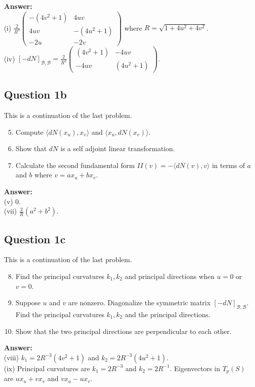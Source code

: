 \documentclass[12pt, a4paper]{article}
\newcommand{\inner}[1]{\langle #1 \rangle}
\begin{document}
\vspace{1em}
\noindent\textbf{Answer:}\\
(i) $\frac{2}{R^{3}}\begin{pmatrix}-(4v^{2}+1)&4uv\\ 4uv&-(4u^{2}+1)\\ -2u&-2v\end{pmatrix}$ where $R=\sqrt{1+4u^{2}+4v^{2}}$.\\
(iv) $[-dN]_{\mathcal{B},\mathcal{B}} = \frac{2}{R^{3}}\begin{pmatrix}(4v^{2}+1)&-4uv\\ -4uv&(4u^{2}+1)\end{pmatrix}$.
\newpage

\subsection*{Question 1b}
This is a continuation of the last problem.
\begin{enumerate}[label=(\roman*)]
    \setcounter{enumi}{4}
    \item Compute $\inner{dN(x_{u}),x_{v}}$ and $\inner{x_{u},dN(x_{v})}$.
    \item Show that $dN$ is a self adjoint linear transformation.
    \item Calculate the second fundamental form $II(v)=-\inner{dN(v),v}$ in terms of $a$ and $b$ where $v=ax_{u}+bx_{v}$.
\end{enumerate}
\vspace{1em}
\noindent\textbf{Answer:}\\
(v) 0. \\
(vii) $\frac{2}{R}(a^{2}+b^{2})$.
\newpage

\subsection*{Question 1c}
This is a continuation of the last problem.
\begin{enumerate}[label=(\roman*)]
    \setcounter{enumi}{7}
    \item Find the principal curvatures $k_1, k_2$ and principal directions when $u=0$ or $v=0$.
    \item Suppose $u$ and $v$ are nonzero. Diagonalize the symmetric matrix $[-dN]_{\mathcal{B},\mathcal{B}}$. Find the principal curvatures $k_1, k_2$ and the principal directions.
    \item Show that the two principal directions are perpendicular to each other.
\end{enumerate}
\vspace{1em}
\noindent\textbf{Answer:}\\
(viii) $k_{1}=2R^{-3}(4v^{2}+1)$ and $k_{2}=2R^{-3}(4u^{2}+1)$.\\
(ix) Principal curvatures are $k_{1}=2R^{-3}$ and $k_{2}=2R^{-1}$. Eigenvectors in $T_p(S)$ are $ux_u+vx_v$ and $vx_u-ux_v$.
\newpage
\end{document}
